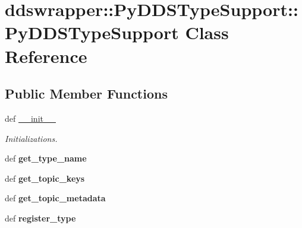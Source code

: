 \hypertarget{classddswrapper_1_1_py_d_d_s_type_support_1_1_py_d_d_s_type_support}{
\section{ddswrapper::PyDDSTypeSupport::PyDDSTypeSupport Class Reference}
\label{classddswrapper_1_1_py_d_d_s_type_support_1_1_py_d_d_s_type_support}
}
\subsection*{Public Member Functions}
\begin{DoxyCompactItemize}
\item 
\hypertarget{classddswrapper_1_1_py_d_d_s_type_support_1_1_py_d_d_s_type_support_a666395e1062167d9e83ef7375c50583f}{
def \hyperlink{classddswrapper_1_1_py_d_d_s_type_support_1_1_py_d_d_s_type_support_a666395e1062167d9e83ef7375c50583f}{\_\-\_\-init\_\-\_\-}}
\label{classddswrapper_1_1_py_d_d_s_type_support_1_1_py_d_d_s_type_support_a666395e1062167d9e83ef7375c50583f}

\begin{DoxyCompactList}\small\item\em Initializations. \end{DoxyCompactList}\item 
\hypertarget{classddswrapper_1_1_py_d_d_s_type_support_1_1_py_d_d_s_type_support_a0dddedf8866e6d5a93e66a0c26d282d1}{
def {\bfseries get\_\-type\_\-name}}
\label{classddswrapper_1_1_py_d_d_s_type_support_1_1_py_d_d_s_type_support_a0dddedf8866e6d5a93e66a0c26d282d1}

\item 
\hypertarget{classddswrapper_1_1_py_d_d_s_type_support_1_1_py_d_d_s_type_support_ae48e5143ec9375fbc934ce2828807943}{
def {\bfseries get\_\-topic\_\-keys}}
\label{classddswrapper_1_1_py_d_d_s_type_support_1_1_py_d_d_s_type_support_ae48e5143ec9375fbc934ce2828807943}

\item 
\hypertarget{classddswrapper_1_1_py_d_d_s_type_support_1_1_py_d_d_s_type_support_a49bd6c7feffbb90d87c8fb6b7a24a821}{
def {\bfseries get\_\-topic\_\-metadata}}
\label{classddswrapper_1_1_py_d_d_s_type_support_1_1_py_d_d_s_type_support_a49bd6c7feffbb90d87c8fb6b7a24a821}

\item 
\hypertarget{classddswrapper_1_1_py_d_d_s_type_support_1_1_py_d_d_s_type_support_a6977b75f278c4ec0776a9fc48da6b157}{
def {\bfseries register\_\-type}}
\label{classddswrapper_1_1_py_d_d_s_type_support_1_1_py_d_d_s_type_support_a6977b75f278c4ec0776a9fc48da6b157}


\end{DoxyCompactItemize}
